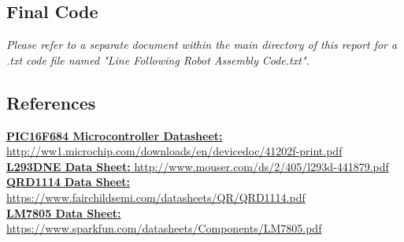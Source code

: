\documentclass[12pt]{article}
\begin{document}
\subsection{Final Code}
\textit{Please refer to a separate document within the main directory of this report for a .txt code file named "Line Following Robot Assembly Code.txt".}
\subsection{References}
\href{http://ww1.microchip.com/downloads/en/devicedoc/41202f-print.pdf}{\textbf{PIC16F684 Microcontroller Datasheet:} http://ww1.microchip.com/downloads/en/devicedoc/41202f-print.pdf}\\
\href{http://www.mouser.com/ds/2/405/l293d-441879.pdf}{\textbf{L293DNE Data Sheet:} http://www.mouser.com/ds/2/405/l293d-441879.pdf}\\
\href{https://www.fairchildsemi.com/datasheets/QR/QRD1114.pdf}{\textbf{QRD1114 Data Sheet:} https://www.fairchildsemi.com/datasheets/QR/QRD1114.pdf}\\
\href{https://www.sparkfun.com/datasheets/Components/LM7805.pdf}{\textbf{LM7805 Data Sheet:} https://www.sparkfun.com/datasheets/Components/LM7805.pdf}\\
\end{document}
